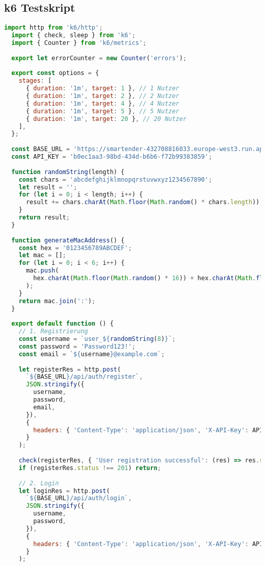 \subsection{k6 Testskript}
\begin{lstlisting}[language=JavaScript]
  import http from 'k6/http';
  import { check, sleep } from 'k6';
  import { Counter } from 'k6/metrics';
  
  export let errorCounter = new Counter('errors');
  
  export const options = {
    stages: [
      { duration: '1m', target: 1 }, // 1 Nutzer
      { duration: '1m', target: 2 }, // 2 Nutzer
      { duration: '1m', target: 4 }, // 4 Nutzer
      { duration: '1m', target: 5 }, // 5 Nutzer
      { duration: '1m', target: 20 }, // 20 Nutzer
    ],
  };
  
  const BASE_URL = 'https://smartender-432708816033.europe-west3.run.app';
  const API_KEY = 'b0ec1aa3-98bd-434d-b6b6-f72b99383859';
  
  function randomString(length) {
    const chars = 'abcdefghijklmnopqrstuvwxyz1234567890';
    let result = '';
    for (let i = 0; i < length; i++) {
      result += chars.charAt(Math.floor(Math.random() * chars.length));
    }
    return result;
  }
  
  function generateMacAddress() {
    const hex = '0123456789ABCDEF';
    let mac = [];
    for (let i = 0; i < 6; i++) {
      mac.push(
        hex.charAt(Math.floor(Math.random() * 16)) + hex.charAt(Math.floor(Math.random() * 16))
      );
    }
    return mac.join(':');
  }
  
  export default function () {
    // 1. Registrierung
    const username = `user_${randomString(8)}`;
    const password = 'Password123!';
    const email = `${username}@example.com`;
  
    let registerRes = http.post(
      `${BASE_URL}/api/auth/register`,
      JSON.stringify({
        username,
        password,
        email,
      }),
      {
        headers: { 'Content-Type': 'application/json', 'X-API-Key': API_KEY },
      }
    );
  
    check(registerRes, { 'User registration successful': (res) => res.status === 201 });
    if (registerRes.status !== 201) return;
  
    // 2. Login
    let loginRes = http.post(
      `${BASE_URL}/api/auth/login`,
      JSON.stringify({
        username,
        password,
      }),
      {
        headers: { 'Content-Type': 'application/json', 'X-API-Key': API_KEY },
      }
    );
  

\end{lstlisting}
